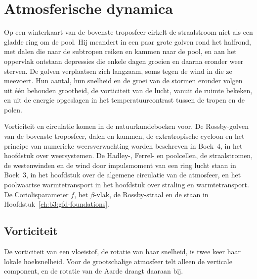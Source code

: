 \chapter{Atmosferische dynamica}\label{ch:b3:atmospheric-dynamics}

Op een winterkaart van de bovenste troposfeer cirkelt de straalstroom niet als een
gladde ring om de pool. Hij meandert in een paar grote golven rond het
halfrond, met dalen die naar de subtropen reiken en kammen naar de
pool, en aan het oppervlak ontstaan depressies die enkele dagen groeien en
daarna eronder weer sterven. De golven verplaatsen zich langzaam, soms tegen de wind in die
ze meevoert. Hun aantal, hun snelheid en de groei van de stormen eronder
volgen uit één behouden grootheid, de vorticiteit van de lucht, vanuit
de ruimte bekeken, en uit de energie opgeslagen in het temperatuurcontrast tussen de
tropen en de polen.

\begin{recall}
Vorticiteit en circulatie komen in de natuurkundeboeken voor. De Rossby-golven van de
bovenste troposfeer, dalen en kammen, de extratropische cycloon en het
principe van numerieke weersverwachting worden beschreven in Boek~4,
in het hoofdstuk over weersystemen. De Hadley-, Ferrel- en poolcellen, de
straalstromen, de westenwinden en de wind door impulsmoment van een ring lucht
staan in Boek~3, in het hoofdstuk over de algemene circulatie van de
atmosfeer, en het poolwaartse warmtetransport in het hoofdstuk over
straling en warmtetransport. De Coriolisparameter $f$, het $\beta$-vlak,
de Rossby-straal en de  staan in
Hoofdstuk~\ref{ch:b3:gfd-foundations}.
\end{recall}

\section{Vorticiteit}\label{sec:b3:atmospheric-dynamics:vorticity}

De vorticiteit van een vloeistof, de rotatie van haar snelheid, is twee keer haar lokale
hoeksnelheid. Voor de grootschalige atmosfeer telt alleen de verticale
component, en de rotatie van de Aarde draagt daaraan bij.

